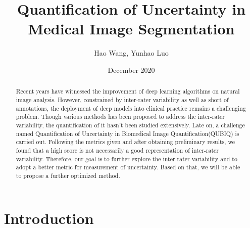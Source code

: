 \documentclass[12pt]{extarticle}
\title{Quantification of Uncertainty in Medical Image Segmentation}
\author{Hao Wang, Yunhao Luo}
\date{December 2020}
\begin{document}
\maketitle
\begin{abstract}
Recent years have witnessed the improvement of deep learning algorithms on natural image 
analysis. However, constrained by inter-rater variability as well as short of annotations, 
the deployment of deep models into clinical practice remains a challenging problem. Though various methods
has been proposed to address the inter-rater variability, the quantification of it hasn't been 
studied extensively. Late on, a challenge named Quantification of Uncertainty in Biomedical Image Quantification(QUBIQ)
is carried out. Following the metrics given and after obtaining preliminary results, we found that a high score 
is not necessarily a good representation of inter-rater variability. Therefore, our goal is to 
further explore the inter-rater variability and to adopt a better metric for measurement of uncertainty. 
Based on that, we will be able to propose a further optimized method. 
\end{abstract}
\section{Introduction}
\end{document}
